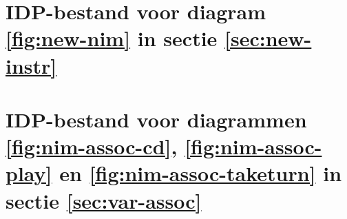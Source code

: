 
\chapter{IDP-bestand voor diagram \ref{fig:new-nim} in sectie \ref{sec:new-instr}}\label{app:new-nim}

\label{code:new-nim}

\chapter{IDP-bestand voor diagrammen \ref{fig:nim-assoc-cd}, \ref{fig:nim-assoc-play} en \ref{fig:nim-assoc-taketurn} in sectie \ref{sec:var-assoc}}\label{app:nim-assoc}

\label{code:nim-assoc}

%
%

%
%